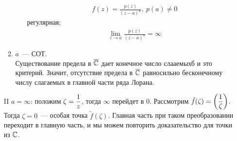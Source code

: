 \begin{itemize}
\begin{enumerate}
\begin{itemize}
\begin{align*}
              & f(z) = \frac{p(z)}{(z-a)^n}, \ p(a) \neq 0
            \end{align*}
            регулярная;
            \begin{align*}
              & \lim_{z \to a} \frac{p(z)}{(z-a)^n} = \infty
            \end{align*}         
        \end{itemize}
        \item $a$~--- СОТ.
        \\
        Существование предела в $\overline{\mathbb{C}}$ дает конечное число слааемыхб и это
        критерий. Значит, отсутствие предела в $\overline{\mathbb{C}}$ равносильно бесконечному
        числу слагаемых в главной части ряда Лорана.
        \end{enumerate}
    \item[II] $a = \infty$: положим $\zeta = \displaystyle \frac{1}{z}$, тогда $\infty$
    перейдет в $0$. Рассмотрим $\tilde{f}(\zeta) = \left( \displaystyle \frac{1}{\zeta}
    \right)$. Тогда $\zeta = 0$~--- особая точка $\tilde{f}(\zeta)$. Главная
    часть при таком преобразовании переходит в главную часть, и мы можем
    повторить доказательство для точки из $\mathbb{C}$.
\end{itemize} 